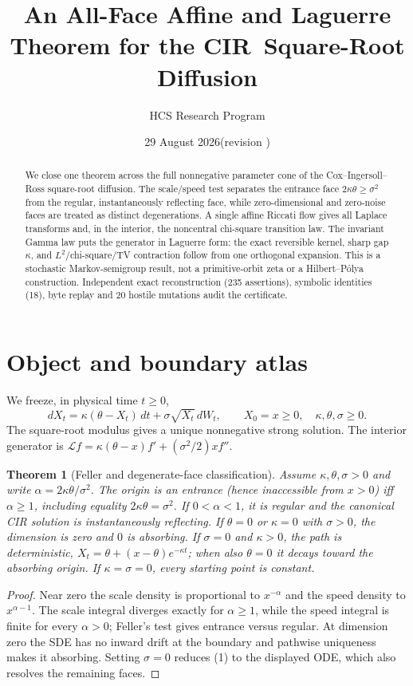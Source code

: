 \documentclass[10pt]{article}
\title{An All-Face Affine and Laguerre Theorem for the CIR\ Square-Root Diffusion}
\author{HCS Research Program}
\date{29 August 2026\quad (revision \CRevisionRound)}
\newtheorem{theorem}{Theorem}
\begin{document}
\maketitle

\begin{abstract}
We close one theorem across the full nonnegative parameter cone of the
Cox--Ingersoll--Ross square-root diffusion.  The scale/speed test separates
the entrance face $2\kappa\theta\geq\sigma^2$ from the regular,
instantaneously reflecting face, while zero-dimensional and zero-noise faces
are treated as distinct degenerations.  A single affine Riccati flow gives all
Laplace transforms and, in the interior, the noncentral chi-square transition
law.  The invariant Gamma law puts the generator in Laguerre form: the exact
reversible kernel, sharp gap $\kappa$, and $L^2$/chi-square/TV contraction
follow from one orthogonal expansion.  This is a stochastic Markov-semigroup
result, not a primitive-orbit zeta or a Hilbert--Pólya construction.
Independent exact reconstruction (235 assertions), symbolic identities (18),
byte replay and 20 hostile mutations audit the certificate.
\end{abstract}

\section{Object and boundary atlas}
We freeze, in physical time $t\geq0$,
\begin{equation}
 dX_t=\kappa(\theta-X_t)\,dt+\sigma\sqrt{X_t}\,dW_t,
 \qquad X_0=x\geq0,\quad \kappa,\theta,\sigma\geq0 . \tag{1}
\end{equation}
The square-root modulus gives a unique nonnegative strong solution.  The
interior generator is
$\mathcal Lf=\kappa(\theta-x)f'+(\sigma^2/2)xf''$.

\begin{theorem}[Feller and degenerate-face classification]\label{thm:feller}
Assume $\kappa,\theta,\sigma>0$ and write
$\alpha=2\kappa\theta/\sigma^2$.  The origin is an entrance (hence
inaccessible from $x>0$) iff $\alpha\geq1$, including equality
$2\kappa\theta=\sigma^2$.  If $0<\alpha<1$, it is regular and the canonical
CIR solution is instantaneously reflecting.  If $\theta=0$ or $\kappa=0$
with $\sigma>0$, the dimension is zero and $0$ is absorbing.  If $\sigma=0$
and $\kappa>0$, the path is deterministic,
$X_t=\theta+(x-\theta)e^{-\kappa t}$; when also $\theta=0$ it decays toward
the absorbing origin.  If $\kappa=\sigma=0$, every starting point is
constant.
\end{theorem}
\begin{proof}
Near zero the scale density is proportional to $x^{-\alpha}$ and the speed
density to $x^{\alpha-1}$.  The scale integral diverges exactly for
$\alpha\geq1$, while the speed integral is finite for every $\alpha>0$;
Feller's test gives entrance versus regular.  At dimension zero the SDE has
no inward drift at the boundary and pathwise uniqueness makes it absorbing.
Setting $\sigma=0$ reduces (1) to the displayed ODE, which also resolves the
remaining faces.
\end{proof}
\end{document}

